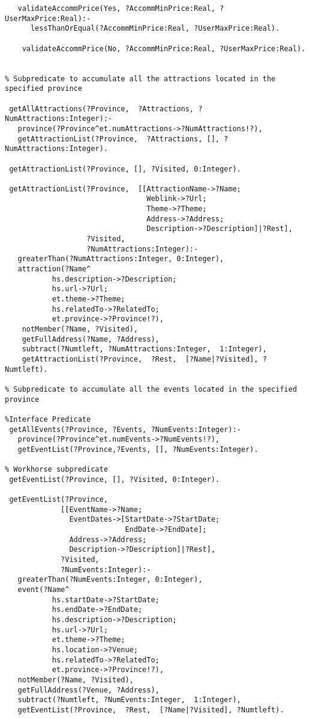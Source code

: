 \begin{verbatim}
   validateAccommPrice(Yes, ?AccommMinPrice:Real, ?UserMaxPrice:Real):-
      lessThanOrEqual(?AccommMinPrice:Real, ?UserMaxPrice:Real).
									
    validateAccommPrice(No, ?AccommMinPrice:Real, ?UserMaxPrice:Real).
	   

% Subpredicate to accumulate all the attractions located in the specified province

 getAllAttractions(?Province,  ?Attractions, ?NumAttractions:Integer):-
   province(?Province^et.numAttractions->?NumAttractions!?),
   getAttractionList(?Province,  ?Attractions, [], ?NumAttractions:Integer).

 getAttractionList(?Province, [], ?Visited, 0:Integer).
 
 getAttractionList(?Province,  [[AttractionName->?Name; 
                                 Weblink->?Url; 
                                 Theme->?Theme;  
                                 Address->?Address;
                                 Description->?Description]|?Rest], 
                   ?Visited, 
                   ?NumAttractions:Integer):-
   greaterThan(?NumAttractions:Integer, 0:Integer),
   attraction(?Name^
           hs.description->?Description;
           hs.url->?Url;
           et.theme->?Theme;
           hs.relatedTo->?RelatedTo;
           et.province->?Province!?),
    notMember(?Name, ?Visited),
    getFullAddress(?Name, ?Address),
    subtract(?Numtleft, ?NumAttractions:Integer,  1:Integer),
    getAttractionList(?Province,  ?Rest,  [?Name|?Visited], ?Numtleft). 

% Subpredicate to accumulate all the events located in the specified province

%Interface Predicate    
 getAllEvents(?Province, ?Events, ?NumEvents:Integer):-
   province(?Province^et.numEvents->?NumEvents!?),
   getEventList(?Province,?Events, [], ?NumEvents:Integer).	

% Workhorse subpredicate 
 getEventList(?Province, [], ?Visited, 0:Integer).
 
 getEventList(?Province,  
             [[EventName->?Name; 
               EventDates->[StartDate->?StartDate; 
                            EndDate->?EndDate]; 
               Address->?Address;  
               Description->?Description]|?Rest],
             ?Visited, 
             ?NumEvents:Integer):-
   greaterThan(?NumEvents:Integer, 0:Integer),
   event(?Name^
           hs.startDate->?StartDate;  
           hs.endDate->?EndDate; 
           hs.description->?Description;
           hs.url->?Url;
           et.theme->?Theme;
           hs.location->?Venue; 		   
           hs.relatedTo->?RelatedTo;
           et.province->?Province!?),
   notMember(?Name, ?Visited),
   getFullAddress(?Venue, ?Address),
   subtract(?Numtleft, ?NumEvents:Integer,  1:Integer),
   getEventList(?Province,  ?Rest,  [?Name|?Visited], ?Numtleft).  
 

\end{verbatim}
